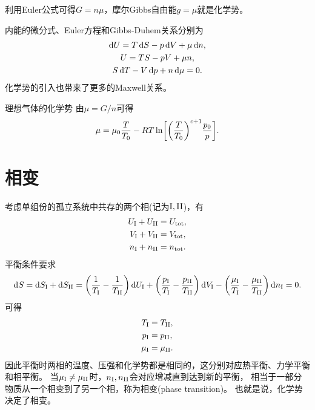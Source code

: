 \begin{corollary}
	利用Euler公式可得$G=n\mu$，摩尔Gibbs自由能$g=\mu$就是化学势。
\end{corollary}

\begin{corollary}
	内能的微分式、Euler方程和Gibbs-Duhem关系分别为
	\begin{subequations}
		\begin{gather}
			\mathop{}\!\mathrm{d} U=T\mathop{}\!\mathrm{d} S-p\mathop{}\!\mathrm{d} V+\mu\mathop{}\!\mathrm{d} n,\\
			U=TS-pV+\mu n,\\
			S\mathop{}\!\mathrm{d} T-V\mathop{}\!\mathrm{d} p+n\mathop{}\!\mathrm{d}\mu=0.
		\end{gather}
	\end{subequations}
	化学势的引入也带来了更多的Maxwell关系。
\end{corollary}

\begin{example}
	{理想气体的化学势}{}
	由$\mu=G/n$可得
	\begin{equation}
		\mu=\mu_0\frac T{T_0}-RT\ln\biggl[\biggl(\frac T{T_0}\biggr)^{c+1}\frac{p_0}p\biggr].
	\end{equation}
\end{example}

\section{相变}
\label{sec:phase transition}

考虑单组份的孤立系统中共存的两个相(记为$\mathrm{I},\mathrm{II}$)，有
\begin{align*}
	U_{\mathrm{I}}+U_{\mathrm{II}}&=U_\mathrm{tot},\\
	V_{\mathrm{I}}+V_{\mathrm{II}}&=V_\mathrm{tot},\\
	n_{\mathrm{I}}+n_{\mathrm{II}}&=n_\mathrm{tot}.
\end{align*}
平衡条件要求
\[
	\mathop{}\!\mathrm{d} S=\mathop{}\!\mathrm{d} S_{\mathrm{I}}+\mathop{}\!\mathrm{d} S_{\mathrm{II}}
	=\biggl(\frac1{T_{\mathrm{I}}}-\frac1{T_{\mathrm{II}}}\biggr)\mathop{}\!\mathrm{d} U_{\mathrm{I}}
	+\biggl(\frac{p_{\mathrm{I}}}{T_{\mathrm{I}}}-\frac{p_{\mathrm{II}}}{T_{\mathrm{II}}}\biggr)\mathop{}\!\mathrm{d} V_{\mathrm{I}}
	-\biggl(\frac{\mu_{\mathrm{I}}}{T_{\mathrm{I}}}-\frac{\mu_{\mathrm{II}}}{T_{\mathrm{II}}}\biggr)\mathop{}\!\mathrm{d} n_{\mathrm{I}}
	=0.
\]
可得
\begin{subequations}
	\begin{align}
		T_{\mathrm{I}}&=T_{\mathrm{II}},\\
		p_{\mathrm{I}}&=p_{\mathrm{II}},\\
		\mu_{\mathrm{I}}&=\mu_{\mathrm{II}}.
	\end{align}
\end{subequations}
因此平衡时两相的温度、压强和化学势都是相同的，这分别对应热平衡、力学平衡和相平衡。
当$\mu_{\mathrm{I}}\neq\mu_{\mathrm{II}}$时，$n_{\mathrm{I}},n_{\mathrm{II}}$会对应增减直到达到新的平衡，
相当于一部分物质从一个相变到了另一个相，称为相变(phase transition)。
也就是说，化学势决定了相变。

